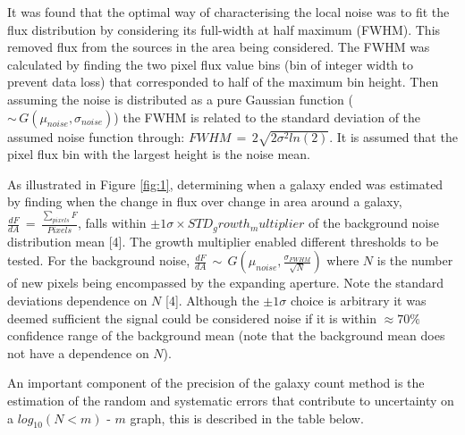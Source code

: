 \documentclass[journal]{IEEEtran}
\begin{document}
\noindent It was found that the optimal way of characterising the local noise was to fit the flux distribution by considering its full-width at half maximum (FWHM). This removed flux from the sources in the area being considered. The FWHM was calculated by finding the two pixel flux value bins (bin of integer width to prevent data loss) that corresponded to half of the maximum bin height. Then assuming the noise is distributed as a pure Gaussian function ($\sim\,G(\mu_{noise},\sigma_{noise})$) the FWHM is related to the standard deviation of the assumed noise function through: $FWHM\,=\,2\sqrt{2\sigma^{2}ln(2)}$. It is assumed that the pixel flux bin with the largest height is the noise mean. \newline

\noindent As illustrated in Figure \ref{fig:1}, determining when a galaxy ended was estimated by finding when the change in flux over change in area around a galaxy, $\frac{dF}{dA}\,=\,\frac{\sum_{pixels}F}{Pixels}$, falls within $\pm1\sigma\times STD_growth_multiplier$ of the background noise distribution mean [4]. The growth multiplier enabled different thresholds to be tested. For the background noise, $\frac{dF}{dA}\,\sim\,G(\mu_{noise}, \frac{\sigma_{FWHM}}{\sqrt{N}})$ where $N$ is the number of new pixels being encompassed by the expanding aperture. Note the standard deviations dependence on $N$ [4]. Although the $\pm1\sigma$ choice is arbitrary it was deemed sufficient the signal could be considered noise if it is within $\approx70\%$ confidence range of the background mean (note that the background mean does not have a dependence on $N$).\newline

\noindent An important component of the precision of the galaxy count method is the estimation of the random and systematic errors that contribute to uncertainty on a $log_{10}(N<m)$ - $m$ graph, this is described in the table below.
\end{document}
